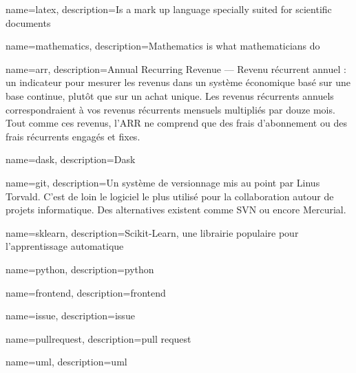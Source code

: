 
\makeglossaries

{
    name=latex,
    description={Is a mark up language specially suited
    for scientific documents}
}

{
    name=mathematics,
    description={Mathematics is what mathematicians do}
}

{
    name=arr,
    description={Annual Recurring Revenue — Revenu récurrent annuel : un
indicateur pour mesurer les revenus dans un système économique basé sur une
base continue, plutôt que sur un achat unique. Les revenus récurrents annuels
correspondraient à vos revenus récurrents mensuels multipliés par douze mois.
Tout comme ces revenus, l'ARR ne comprend que des frais d'abonnement ou des
frais récurrents engagés et fixes. }
}

{
    name=dask,
    description={Dask}
}

{
    name=git,
    description={Un système de versionnage mis au point par Linus Torvald.
C'est de loin le logiciel le plus utilisé pour la collaboration autour de
projets informatique. Des alternatives existent comme SVN ou encore Mercurial.}
}

{
    name=sklearn,
    description={Scikit-Learn, une librairie populaire pour l'apprentissage
automatique}
}

{
    name=python,
    description={python}
}

{
    name=frontend,
    description={frontend}
}

{
    name=issue,
    description={issue}
}

{
    name=pullrequest,
    description={pull request}
}

{
    name=uml,
    description={uml}
}

